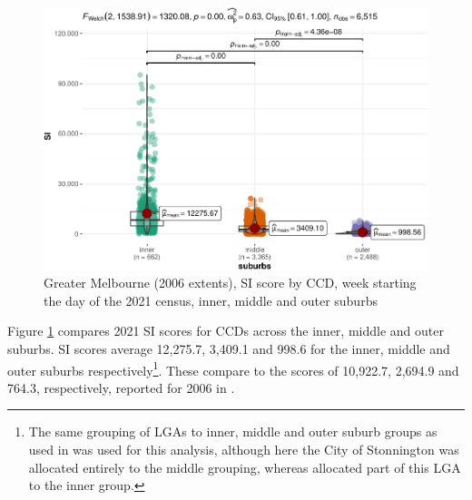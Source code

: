 \documentclass[preprint, 3p,
authoryear]{elsarticle} %
\begin{document}
\begin{figure}
\includegraphics[width=1\linewidth]{Leveraging_GTFS_to_assess_transit_supply_Transport_Geography_files/figure-latex/Greater_Melbourne_CCD_2021_by_suburbs_SI_scores-1} \caption{Greater Melbourne (2006 extents), SI score by CCD, week starting the day of the 2021 census, inner, middle and outer suburbs}\label{fig:Greater_Melbourne_CCD_2021_by_suburbs_SI_scores}
\end{figure}

Figure \ref{fig:Greater_Melbourne_CCD_2021_by_suburbs_SI_scores}
compares 2021 SI scores for CCDs across the inner, middle and outer
suburbs. SI scores average 12,275.7, 3,409.1 and 998.6 for the inner,
middle and outer suburbs respectively\footnote{The same grouping of LGAs
  to inner, middle and outer suburb groups as used in
  \citet{currie2010identifying} was used for this analysis, although
  here the City of Stonnington was allocated entirely to the middle
  grouping, whereas \citet{currie2010identifying} allocated part of this
  LGA to the inner group.}. These compare to the scores of 10,922.7,
2,694.9 and 764.3, respectively, reported for 2006 in
\citet{currie2010identifying}.
\end{document}
